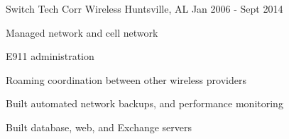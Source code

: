 \begin{cventries}
  \cventry
    {Switch Tech} %
    {Corr Wireless} %
    {Huntsville, AL} %
    {Jan 2006 - Sept 2014} %
    {
      \begin{cvitems} %
        \item {Managed network and cell network}
        \item {E911 administration}
        \item {Roaming coordination between other wireless providers}
        \item {Built automated network backups, and performance monitoring}
        \item {Built database, web, and Exchange servers}
      \end{cvitems}
    }

\end{cventries}
